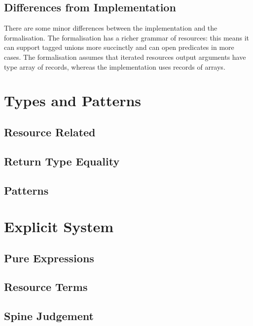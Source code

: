 \documentclass[11pt]{article}%
\begin{document}
\subsection{Differences from Implementation}

There are some minor differences between the implementation and the
formalisation. The formalisation has a richer grammar of resources:
this means it can support tagged unions more succinctly and can open
predicates in more cases. The formalisation assumes that iterated
resources output arguments have type array of records, whereas the
implementation uses records of arrays.


\raggedright%

\section{Types and Patterns}

\subsection{Resource Related}
\cndefnsresXXjudge%

\subsection{Return Type Equality}
\cndefnsretXXjudge%

\subsection{Patterns}
\cndefnspatXXjudge%

\section{Explicit System}

\subsection{Pure Expressions}
\cndefnsexplXXpure%

\subsection{Resource Terms}
\cndefnsexplXXres%

\subsection{Spine Judgement}
\cndefnsexplXXspine%
\end{document}
